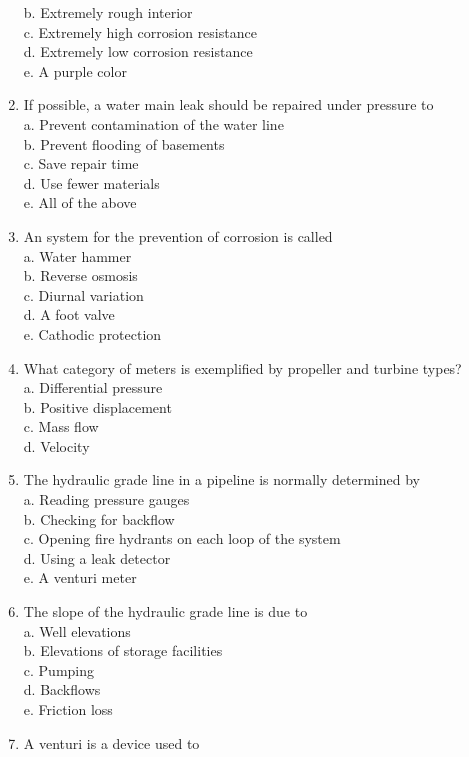 \begin{enumerate}[1.]
b. Extremely rough interior\\
c. Extremely high corrosion resistance\\
d. Extremely low corrosion resistance\\
e. A purple color\\
\item If possible, a water main leak should be repaired under pressure to\\
a. Prevent contamination of the water line\\
b. Prevent flooding of basements\\
c. Save repair time\\
d. Use fewer materials\\
e. All of the above\\
\item An system for the prevention of corrosion is called\\
a. Water hammer\\
b. Reverse osmosis\\
c. Diurnal variation\\
d. A foot valve\\
e. Cathodic protection\\
\item What category of meters is exemplified by propeller and turbine types?\\
a. Differential pressure\\
b. Positive displacement\\
c. Mass flow\\
d. Velocity\\
\item The hydraulic grade line in a pipeline is normally determined by\\
a. Reading pressure gauges\\
b. Checking for backflow\\
c. Opening fire hydrants on each loop of the system\\
d. Using a leak detector\\
e. A venturi meter\\
\item The slope of the hydraulic grade line is due to\\
a. Well elevations\\
b. Elevations of storage facilities\\
c. Pumping\\
d. Backflows\\
e. Friction loss\\
\item A venturi is a device used to\\

\end{enumerate}
